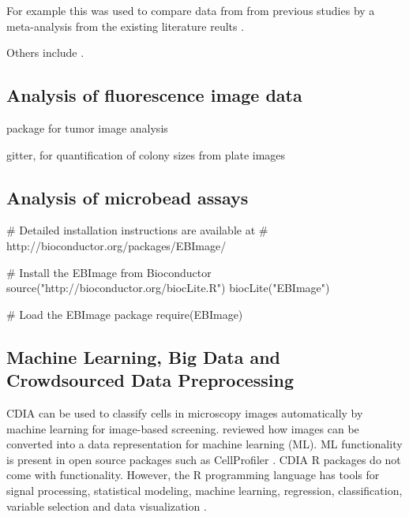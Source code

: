  For example this 
was used to compare data from from previous studies by a meta-analysis from the 
existing literature reults \citep{stocco_coordinate-based_2014}.

Others include  \citep{dunning_beadarray:_2006, frery_introduction_2013}.

\subsection{Analysis of fluorescence image data}

 package \citep{failmezger_crimage:_2012} for tumor image analysis


gitter, for quantification of colony sizes from plate images \citep{wagih_gitter:_2014}


\subsection{Analysis of microbead assays}

\citep{rodiger_highly_2013, rodiger_nucleic_2014}

\begin{example}
# Detailed installation instructions are available at 
# http://bioconductor.org/packages/EBImage/

# Install the EBImage from Bioconductor
source("http://bioconductor.org/biocLite.R")
biocLite("EBImage")

# Load the EBImage package
require(EBImage)


\end{example}

\subsection{Machine Learning, Big Data and Crowdsourced Data Preprocessing}
CDIA can be used to classify cells in microscopy images automatically by machine 
learning for image-based screening. \citet{sommer_machine_2013} reviewed how 
images can be converted into a data representation for machine learning (ML). ML 
functionality is present in open source packages such as CellProfiler 
\citep{conrad_micropilot:_2011, sommer_machine_2013}. CDIA R packages do not 
come with functionality. However, the R programming language has tools for 
signal processing, statistical modeling, machine learning, regression, 
classification, variable selection and data visualization 
\citep{abbas_comparative_2014, fuchs_clustering_2010, pau_ebimager_2010, 
genuer-poggi-tuleaumalot:2015}. 

